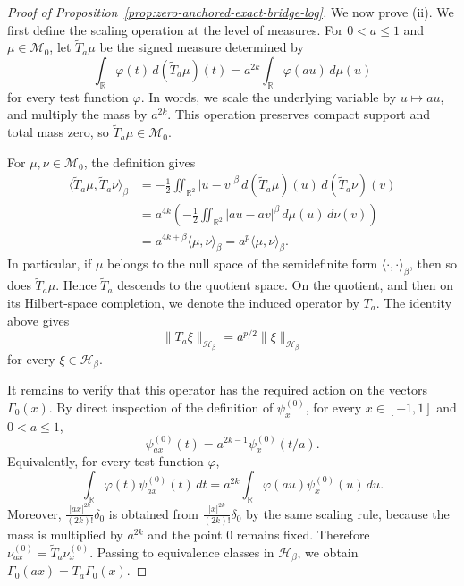 \documentclass[10pt,a4paper]{amsart}
\begin{document}
\begin{proof}[Proof of Proposition~\ref{prop:zero-anchored-exact-bridge-log}]
We now prove \textnormal{(ii)}.  We first define the scaling operation at the
level of measures.  For \(0<a\le1\) and \(\mu\in\mathcal M_0\), let
\(\widetilde T_a\mu\) be the signed measure determined by
\[
\int_{\mathbb R}\varphi(t)\,d(\widetilde T_a\mu)(t)
=
a^{2k}\int_{\mathbb R}\varphi(au)\,d\mu(u)
\]
for every test function \(\varphi\).  In words, we scale the underlying variable by
\(u\mapsto au\), and multiply the mass by \(a^{2k}\).  This operation preserves
compact support and total mass zero, so \(\widetilde T_a\mu\in\mathcal M_0\).

For \(\mu,\nu\in\mathcal M_0\), the definition gives
\[
\begin{aligned}
\langle \widetilde T_a\mu,\widetilde T_a\nu\rangle_\beta
&=
-\frac12\iint_{\mathbb R^2}|u-v|^\beta\,
d(\widetilde T_a\mu)(u)\,d(\widetilde T_a\nu)(v)\\
&=
a^{4k}\left(
-\frac12\iint_{\mathbb R^2}|au-av|^\beta\,d\mu(u)\,d\nu(v)
\right)\\
&=
a^{4k+\beta}\langle\mu,\nu\rangle_\beta
=
a^p\langle\mu,\nu\rangle_\beta .
\end{aligned}
\]
In particular, if \(\mu\) belongs to the null space of the semidefinite form
\(\langle\cdot,\cdot\rangle_\beta\), then so does \(\widetilde T_a\mu\).  Hence
\(\widetilde T_a\) descends to the quotient space.  On the quotient, and then on
its Hilbert-space completion, we denote the induced operator by \(T_a\).  The
identity above gives
\[
\|T_a\xi\|_{\mathcal H_\beta}=a^{p/2}\|\xi\|_{\mathcal H_\beta}
\]
for every \(\xi\in\mathcal H_\beta\).

It remains to verify that this operator has the required action on the vectors
\(\Gamma_0(x)\).  By direct inspection of the definition of
\(\psi_x^{(0)}\), for every \(x\in[-1,1]\) and \(0<a\le1\),
\[
\psi_{ax}^{(0)}(t)=a^{2k-1}\psi_x^{(0)}(t/a).
\]
Equivalently, for every test function \(\varphi\),
\[
\int_{\mathbb R}\varphi(t)\psi_{ax}^{(0)}(t)\,dt
=
a^{2k}\int_{\mathbb R}\varphi(au)\psi_x^{(0)}(u)\,du.
\]
Moreover,
\(
\frac{|ax|^{2k}}{(2k)!}\delta_0
\)
is obtained from
\(
\frac{|x|^{2k}}{(2k)!}\delta_0
\)
by the same scaling rule, because the mass is multiplied by \(a^{2k}\) and the
point \(0\) remains fixed.  Therefore
\(
\nu_{ax}^{(0)}=\widetilde T_a\nu_x^{(0)}.
\)
Passing to equivalence classes in \(\mathcal H_\beta\), we obtain
\(
\Gamma_0(ax)=T_a\Gamma_0(x).
\)


\end{proof}
\end{document}
